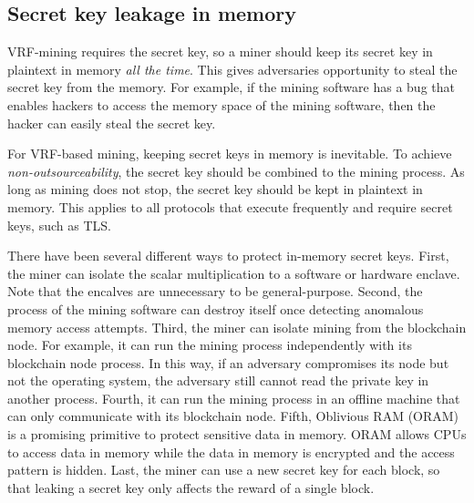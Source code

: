 \subsection{Secret key leakage in memory}

VRF-mining requires the secret key, so a miner should keep its secret key in plaintext in memory \emph{all the time}.
This gives adversaries opportunity to steal the secret key from the memory.
For example, if the mining software has a bug that enables hackers to access the memory space of the mining software, then the hacker can easily steal the secret key.

For VRF-based mining, keeping secret keys in memory is inevitable.
To achieve \emph{non-outsourceability}, the secret key should be combined to the mining process.
As long as mining does not stop, the secret key should be kept in plaintext in memory.
This applies to all protocols that execute frequently and require secret keys, such as TLS.

There have been several different ways to protect in-memory secret keys.
First, the miner can isolate the scalar multiplication to a software or hardware enclave.
Note that the encalves are unnecessary to be general-purpose.
Second, the process of the mining software can destroy itself once detecting anomalous memory access attempts.
Third, the miner can isolate mining from the blockchain node.
For example, it can run the mining process independently with its blockchain node process.
In this way, if an adversary compromises its node but not the operating system, the adversary still cannot read the private key in another process.
Fourth, it can run the mining process in an offline machine that can only communicate with its blockchain node.
Fifth, Oblivious RAM (ORAM) is a promising primitive to protect sensitive data in memory.
ORAM allows CPUs to access data in memory while the data in memory is encrypted and the access pattern is hidden.
Last, the miner can use a new secret key for each block, so that leaking a secret key only affects the reward of a single block.

